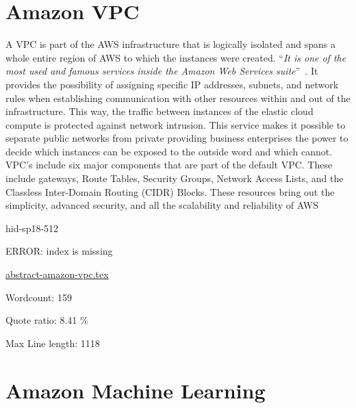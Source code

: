 \section{Amazon VPC}

A VPC is part of the AWS infrastructure that is logically isolated and spans a whole entire region of AWS to which the instances were created. \color{blue}``\emph{It is one of the most used and famous services inside the Amazon Web Services suite}''\color{black}~\cite{hid-sp18-512-amazon-vpc-a}. It provides the possibility of assigning specific IP addresses, subnets, and network rules when establishing communication with other resources within and out of the infrastructure. This way, the traffic between instances of the elastic cloud compute is protected against network intrusion. This service makes it possible to separate public networks from private providing business enterprises the power to decide which instances can be exposed to the outside word and which cannot. VPC's include six major components that are part of the default VPC. These include gateways, Route Tables, Security Groups, Network Access Lists, and the Classless Inter-Domain Routing (CIDR) Blocks. These resources bring out the simplicity, advanced security, and all the scalability and reliability of AWS~\cite{hid-sp18-512-amazon-vpc}


\begin{IU}

hid-sp18-512

ERROR: index is missing

\href{https://github.com/cloudmesh-community/hid-sp18-512/blob/master//technology/abstract-amazon-vpc.tex}{abstract-amazon-vpc.tex}

 

Wordcount: 159


Quote ratio: 8.41 \%
 
Max Line length: 1118
\end{IU}

\section{Amazon Machine Learning}

